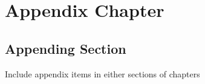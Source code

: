 \appendix

\begingroup

\chapter{Appendix Chapter}
\label{app:appendix_chapter}

\section{Appending Section}
\label{app:sec:appendix_section}
Include appendix items in either sections of chapters

\endgroup
